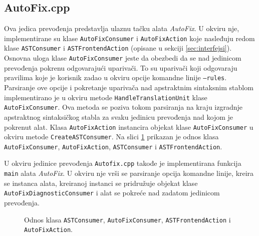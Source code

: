 \documentclass[12pt,oneside]{memoir}
\begin{document}
\subsection{AutoFix.cpp}
Ova jedica prevođenja predstavlja ulaznu ta\v{c}ku alata \textit{AutoFix}. U okviru nje, implementirane su klase \texttt{AutoFixConsumer} i \texttt{AutoFixAction} koje nasleđuju redom klase \texttt{ASTConsumer} i \texttt{ASTFrontendAction} (opisane u sekciji \ref{sec:interfejsi}). Osnovna uloga klase \texttt{AutoFixConsumer} jeste da obezbedi da se nad jedinicom prevođenja pokrenu odgovaraju\'{c}i upariva\v{c}i. To su upariva\v{c}i koji odgovaraju pravilima koje je korisnik zadao u okviru opcije komandne linije \texttt{--rules}. Parsiranje ove opcije i  pokretanje upariva\v{c}a nad apstraktnim sintaksnim stablom implementirano je u okviru metode \texttt{HandleTranslation\-Unit} klase \texttt{AutoFixConsumer}. Ova metoda se poziva tokom parsiranja na kraju izgradnje apstraktnog sintaksi\v{c}kog stabla za svaku jedinicu prevođenja nad kojom je pokrenut alat. Klasa \texttt{AutoFixAction} instancira objekat klase \texttt{AutoFixConsumer} u okviru metode \texttt{CreateASTConsumer}.
Na slici \ref{fig:uml1} prikazan je odnos klasa \texttt{AutoFixConsumer}, \texttt{AutoFixAction}, \texttt{ASTConsumer} i \texttt{ASTFrontendAction}. \par
U okviru jedinice prevođenja \texttt{Autofix.cpp} takođe je implementirana funkcija \texttt{main} alata \textit{AutoFix}. U okviru nje vr\v{s}i se parsiranje opcija komandne linije, kreira se instanca alata, kreiranoj instanci se pridru\v{z}uje objekat klase \texttt{AutoFix\-DiagnosticConsumer} i alat se pokre\'{c}e nad zadatom jedinicom prevođenja. 

\begin{figure}
  \caption{Odnos klasa \texttt{ASTConsumer}, \texttt{AutoFixConsumer}, \texttt{ASTFrontendAction} i \texttt{AutoFixAction}.}
  \label{fig:uml1}

\end{figure}
\end{document}
